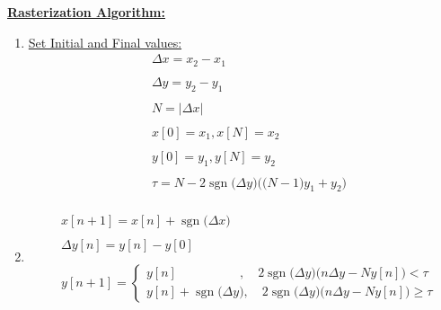 \documentclass{article}
\DeclareMathOperator{\sgn}{sgn}
\begin{document}
\underline{\textbf{Rasterization Algorithm:}} \\
\begin{enumerate}
    \item \underline{Set Initial and Final values:}
           \begin{align*}
                &\Delta x = x_{2} - x_{1} \\ \\
                &\Delta y = y_{2} - y_{1} \\ \\
                &N = |\Delta x| \\ \\  
                &x[0] = x_{1}, x[N] = x_{2} \\ \\
                &y[0] = y_{1}, y[N] = y_{2} \\ \\ 
                &\tau = N - 2\sgn\big(\Delta y\big)\bigg(\big(N - 1\big)y_{1} + y_{2}\bigg) \\ 
             \end{align*}
    \item {} 
           \begin{align*}
                &x[n + 1] = x[n] + \sgn\big(\Delta x\big) \\ \\ 
                &\Delta y[n] = y[n] - y[0] \\ \\  
                &y[n + 1] = \begin{cases}
                                y[n] \quad \quad \quad \quad \quad, \quad 2\sgn\big(\Delta y\big)\Bigg(n\Delta y - Ny[n] \Bigg) < \tau \\
                                y[n] + \sgn\big(\Delta y\big), \quad 2\sgn\big(\Delta y\big)\Bigg(n\Delta y - Ny[n] \Bigg) \geq \tau
                              \end{cases} 
            \end{align*}
\end{enumerate}
\end{document}
